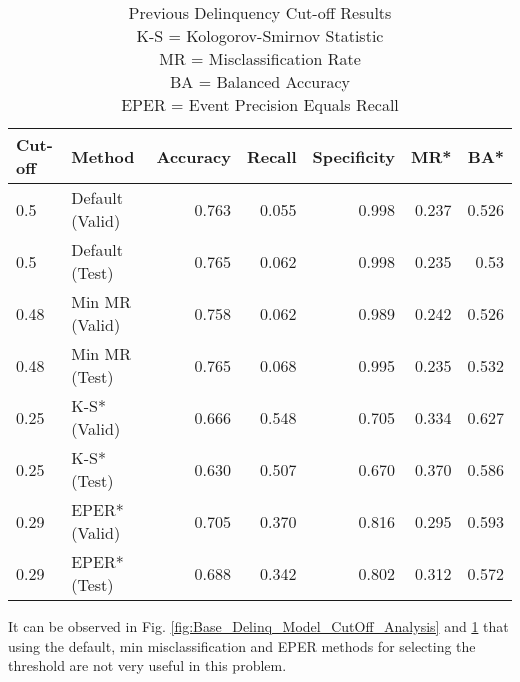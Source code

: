 \begin{table}[H]
	\centering
	\resizebox{\textwidth}{!}
	{
		\begin{tabular}{l|l|r|r|r|r|r|}
			\hline
\textbf{Cut-off} & \textbf{Method}       & \textbf{Accuracy} & \textbf{Recall} & \textbf{Specificity} & \textbf{MR*} & \textbf{BA*} \\ \hline
0.5              & Default (Valid)       & 0.763             & 0.055           & 0.998                & 0.237   & 0.526    \\
0.5              & Default (Test)        & 0.765             & 0.062           & 0.998                & 0.235      & 0.53  \\ \hline
0.48             & Min MR (Valid)        & 0.758             & 0.062           & 0.989                & 0.242       & 0.526 \\
0.48             & Min MR (Test)         & \cellcolor{yellow!25}0.765         & 0.068 & \cellcolor{yellow!25}0.995                & \cellcolor{yellow!25}0.235    & 0.532   \\ \hline
0.25             & K-S* (Valid) 		     & 0.666             & 0.548           & 0.705                & 0.334     & 0.627  \\
0.25             & K-S* (Test)  		     & 0.630             & \cellcolor{yellow!25}0.507           & 0.670                & 0.370  & \cellcolor{yellow!25}0.586     \\ \hline
0.29             & EPER* (Valid)          & 0.705             & 0.370           & 0.816                & 0.295    & 0.593   \\
0.29             & EPER* (Test)           & 0.688             & 0.342           & 0.802                & 0.312  & 0.572    \\ \hline
\end{tabular}
	}
	\caption{Previous Delinquency Cut-off Results 
	\\ K-S = Kologorov-Smirnov Statistic
	\\ MR = Misclassification Rate
	\\ BA = Balanced Accuracy
	\\ EPER = Event Precision Equals Recall
		}
	\label{table:DelinquencyModelCutoff}
\end{table}

It can be observed in Fig. \ref{fig:Base_Delinq_Model_CutOff_Analysis} and \ref{table:DelinquencyModelCutoff} that using the default, min misclassification and EPER methods for selecting the threshold are not very useful in this problem.

